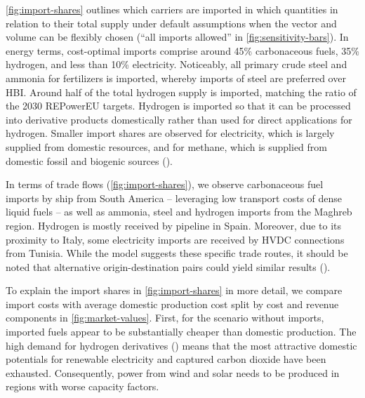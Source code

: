 
\cref{fig:import-shares} outlines which carriers are imported in which
quantities in relation to their total supply under default assumptions when the
vector and volume can be flexibly chosen (``all imports allowed'' in
\cref{fig:sensitivity-bars}). In energy terms, cost-optimal imports comprise
around 45\% carbonaceous fuels, 35\% hydrogen, and less than 10\% electricity.
Noticeably, all primary crude steel and ammonia for fertilizers is imported,
whereby imports of steel are preferred over HBI. Around half of the total
hydrogen supply is imported, matching the ratio of the 2030 REPowerEU targets.
Hydrogen is imported so that it can be processed into derivative products
domestically rather than used for direct applications for hydrogen. Smaller
import shares are observed for electricity, which is largely supplied from
domestic resources, and for methane, which is supplied from domestic fossil and
biogenic sources ().


In terms of trade flows (\cref{fig:import-shares}), we observe carbonaceous fuel
imports by ship from South America -- leveraging low transport costs of dense
liquid fuels -- as well as ammonia, steel and hydrogen imports from the Maghreb
region. Hydrogen is mostly received by pipeline in Spain. Moreover, due to its
proximity to Italy, some electricity imports are received by HVDC connections
from Tunisia. While the model suggests these specific trade routes, it should be
noted that alternative origin-destination pairs could yield similar results
().


To explain the import shares in \cref{fig:import-shares} in more detail, we
compare import costs with average domestic production cost split by cost and
revenue components in \cref{fig:market-values}. First, for the scenario without
imports, imported fuels appear to be substantially cheaper than domestic
production. The high demand for hydrogen derivatives ()
means that the most attractive domestic potentials for renewable electricity and
captured carbon dioxide have been exhausted. Consequently, power from wind and
solar needs to be produced in regions with worse capacity factors.


